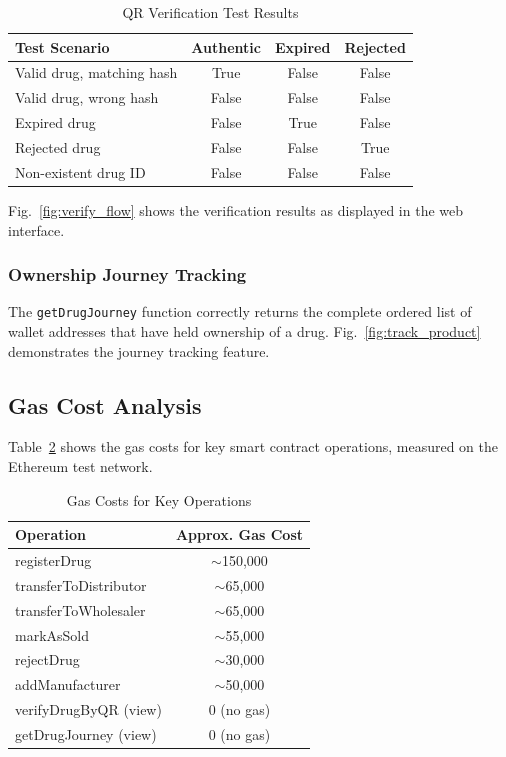\documentclass[conference]{IEEEtran}
\begin{document}
\begin{table}[htbp]
\caption{QR Verification Test Results}
\begin{center}
\begin{tabular}{|p{2.5cm}|c|c|c|}
\hline
\textbf{Test Scenario} & \textbf{Authentic} & \textbf{Expired} & \textbf{Rejected} \\
\hline
Valid drug, matching hash & True & False & False \\
\hline
Valid drug, wrong hash & False & False & False \\
\hline
Expired drug & False & True & False \\
\hline
Rejected drug & False & False & True \\
\hline
Non-existent drug ID & False & False & False \\
\hline
\end{tabular}
\label{tab:qr_test}
\end{center}
\end{table}

Fig.~\ref{fig:verify_flow} shows the verification results as displayed in the web interface. 

\subsubsection{Ownership Journey Tracking}
The \texttt{getDrugJourney} function correctly returns the complete ordered list of wallet addresses that have held ownership of a drug. Fig.~\ref{fig:track_product} demonstrates the journey tracking feature.


\subsection{Gas Cost Analysis}

Table~\ref{tab:gas} shows the gas costs for key smart contract operations, measured on the Ethereum test network.

\begin{table}[htbp]
\caption{Gas Costs for Key Operations}
\begin{center}
\begin{tabular}{|l|c|}
\hline
\textbf{Operation} & \textbf{Approx. Gas Cost} \\
\hline
registerDrug & $\sim$150,000 \\
\hline
transferToDistributor & $\sim$65,000 \\
\hline
transferToWholesaler & $\sim$65,000 \\
\hline
markAsSold & $\sim$55,000 \\
\hline
rejectDrug & $\sim$30,000 \\
\hline
addManufacturer & $\sim$50,000 \\
\hline
verifyDrugByQR (view) & 0 (no gas) \\
\hline
getDrugJourney (view) & 0 (no gas) \\
\hline
\end{tabular}
\label{tab:gas}
\end{center}
\end{table}
\end{document}
